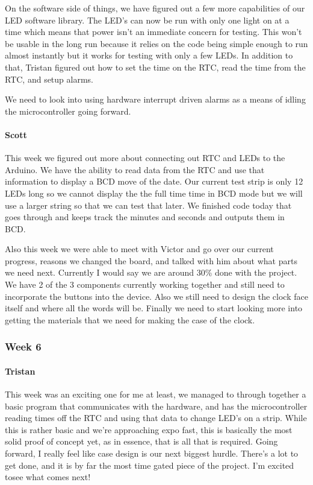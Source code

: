 \documentclass[onecolumn, draftclsnofoot,10pt, compsoc]{IEEEtran}
\begin{document}
On the software side of things, we have figured out a few more capabilities of our LED software library. The LED's can now be run with only one light on at a time which means that power isn't an immediate concern for testing. This won't be usable in the long run because it relies on the code being simple enough to run almost instantly but it works for testing with only a few LEDs. In addition to that, Tristan figured out how to set the time on the RTC, read the time from the RTC, and setup alarms.

We need to look into using hardware interrupt driven alarms as a means of idling the microcontroller going forward.
\paragraph{Scott}
This week we figured out more about connecting out RTC and LEDs to the Arduino. We have the ability to read data from the RTC and use that information to display a BCD move of the date. Our current test strip is only 12 LEDs long so we cannot display the the full time time in BCD mode but we will use a larger string so that we can test that later. We finished code today that goes through and keeps track the minutes and seconds and outputs them in BCD.

Also this week we were able to meet with Victor and go over our current progress, reasons we changed the board, and talked with him about what parts we need next. Currently I would say we are around 30\% done with the project. We have 2 of the 3 components currently working together and still need to incorporate the buttons into the device. Also we still need to design the clock face itself and where all the words will be. Finally we need to start looking more into getting the materials that we need for making the case of the clock.
\subsubsection{Week 6}
\paragraph{Tristan}
This week was an exciting one for me at least, we managed to through together a basic program that communicates with the hardware, and has the microcontroller reading times off the RTC and using that data to change LED's on a strip. While this is rather basic and we're approaching expo fast, this is basically the most solid proof of concept yet, as in essence, that is all that is required. Going forward, I really feel like case design is our next biggest hurdle. There's a lot to get done, and it is by far the most time gated piece of the project. I'm excited tosee what comes next!
\end{document}
